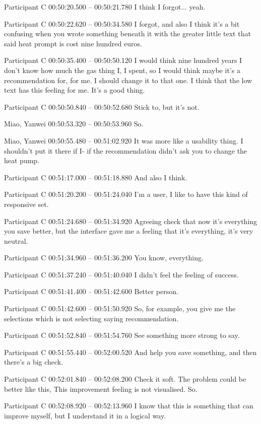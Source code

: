 {Participant C 00:50:20.500 -- 00:50:21.780
I think I forgot... yeah.

Participant C 00:50:22.620 -- 00:50:34.580
I forgot, and also I think it's a bit confusing when you wrote something beneath it with the greater little text that said heat prompt is cost nine hundred euros.

Participant C 00:50:35.400 -- 00:50:50.120
I would think nine hundred years I don't know how much the gas thing I, I spent, so I would think maybe it's a recommendation for, for me. I should change it to that one. I think that the low text has this feeling for me. It's a good thing.

Participant C 00:50:50.840 -- 00:50:52.680
Stick to, but it's not.

Miao, Yanwei 00:50:53.320 -- 00:50:53.960
So.

Miao, Yanwei 00:50:55.480 -- 00:51:02.920
It was more like a usability thing. I shouldn't put it there if I- if the recommendation didn't ask you to change the heat pump.

Participant C 00:51:17.000 -- 00:51:18.880
And also I think.

Participant C 00:51:20.200 -- 00:51:24.040
I'm a user, I like to have this kind of responsive set.

Participant C 00:51:24.680 -- 00:51:34.920
Agreeing check that now it's everything you save better, but the interface gave me a feeling that it's everything, it's very neutral.

Participant C 00:51:34.960 -- 00:51:36.200
You know, everything.

Participant C 00:51:37.240 -- 00:51:40.040
I didn't feel the feeling of success.

Participant C 00:51:41.400 -- 00:51:42.600
Better person.

Participant C 00:51:42.600 -- 00:51:50.920
So, for example, you give me the selections which is not selecting saying recommendation.

Participant C 00:51:52.840 -- 00:51:54.760
See something more strong to say.

Participant C 00:51:55.440 -- 00:52:00.520
And help you save something, and then there's a big check.

Participant C 00:52:01.840 -- 00:52:08.200
Check it soft. The problem could be better like this, This improvement feeling is not visualised. So.

Participant C 00:52:08.920 -- 00:52:13.960
I know that this is something that can improve myself, but I understand it in a logical way.

}
